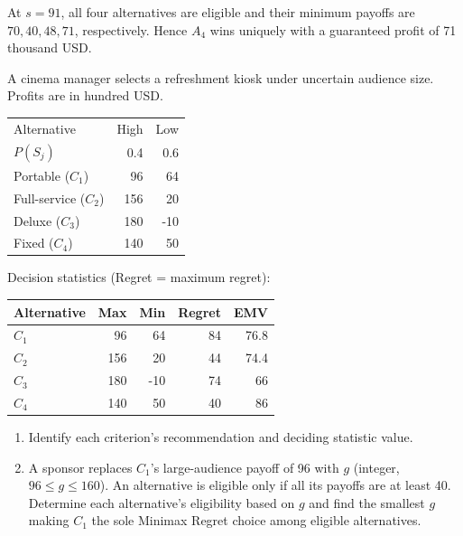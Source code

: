 At $s=91$, all four alternatives are eligible and their minimum
payoffs are $70,40,48,71$, respectively. Hence $A_4$ wins uniquely
with a guaranteed profit of 71 thousand USD.
\secInicio[sec:q1]



A cinema manager selects a refreshment kiosk under uncertain audience size. Profits are in hundred USD.

\begin{center}\small\setlength{\tabcolsep}{4pt}
	\begin{tabular}{lrr}\toprule
		Alternative & High & Low\\
		$P(S_j)$ & 0.4 & 0.6\\ \midrule
		Portable ($C_1$) & 96 & 64\\
		Full-service ($C_2$) & 156 & 20\\
		Deluxe ($C_3$) & 180 & -10\\
		Fixed ($C_4$) & 140 & 50\\
		\bottomrule
	\end{tabular}
\end{center} \vspace{-3mm}

Decision statistics (Regret = maximum regret):

\begin{center}\small\setlength{\tabcolsep}{4pt}
	\begin{tabular}{lrrrr}\toprule
		Alternative & Max & Min & Regret & EMV\\ \midrule
		$C_1$ & 96 & 64 & 84 & 76.8\\
		$C_2$ & 156 & 20 & 44 & 74.4\\
		$C_3$ & 180 & -10 & 74 & 66\\
		$C_4$ & 140 & 50 & 40 & 86\\
		\bottomrule
	\end{tabular}
\end{center}

\begin{enumerate}[label=\textbf{(\alph*)},leftmargin=*]
	\item Identify each criterion's recommendation and deciding statistic value. 

	\item A sponsor replaces $C_1$'s large-audience payoff of 96 with $g$ (integer, $96\leq g\leq160$). An alternative is eligible only if all its payoffs are at least 40. Determine each alternative's eligibility based on $g$ and find the smallest $g$ making $C_1$ the sole Minimax Regret choice among eligible alternatives. 
\end{enumerate}
\label{sol:q2a}
